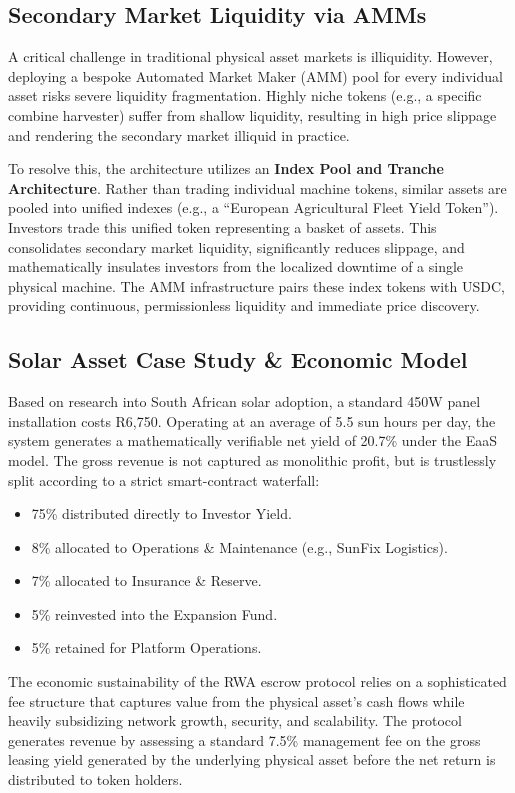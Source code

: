 \documentclass{Resources/bdlt-project}
\begin{document}
\subsection{Secondary Market Liquidity via AMMs}
A critical challenge in traditional physical asset markets is illiquidity. However, deploying a bespoke Automated Market Maker (AMM) pool for every individual asset risks severe liquidity fragmentation. Highly niche tokens (e.g., a specific combine harvester) suffer from shallow liquidity, resulting in high price slippage and rendering the secondary market illiquid in practice.

To resolve this, the architecture utilizes an \textbf{Index Pool and Tranche Architecture}. Rather than trading individual machine tokens, similar assets are pooled into unified indexes (e.g., a ``European Agricultural Fleet Yield Token''). Investors trade this unified token representing a basket of assets. This consolidates secondary market liquidity, significantly reduces slippage, and mathematically insulates investors from the localized downtime of a single physical machine. The AMM infrastructure pairs these index tokens with USDC, providing continuous, permissionless liquidity and immediate price discovery.


\subsection{Solar Asset Case Study \& Economic Model}
Based on research into South African solar adoption, a standard 450W panel installation costs R6,750. Operating at an average of 5.5 sun hours per day, the system generates a mathematically verifiable net yield of 20.7\% under the EaaS model. The gross revenue is not captured as monolithic profit, but is trustlessly split according to a strict smart-contract waterfall:
\begin{itemize}
    \item 75\% distributed directly to Investor Yield.
    \item 8\% allocated to Operations \& Maintenance (e.g., SunFix Logistics).
    \item 7\% allocated to Insurance \& Reserve.
    \item 5\% reinvested into the Expansion Fund.
    \item 5\% retained for Platform Operations.
\end{itemize}

The economic sustainability of the RWA escrow protocol relies on a sophisticated fee structure that captures value from the physical asset's cash flows while heavily subsidizing network growth, security, and scalability. The protocol generates revenue by assessing a standard 7.5\% management fee on the gross leasing yield generated by the underlying physical asset before the net return is distributed to token holders.
\end{document}
